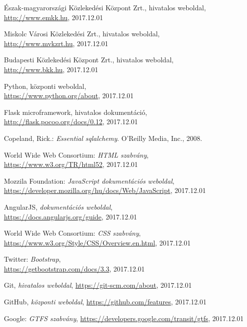 \begin{thebibliography}{x}

Észak-magyarországi Közlekedési Központ Zrt.,
hivatalos weboldal, \\
\url{http://www.emkk.hu}, 2017.12.01

Miskolc Városi Közlekedési Zrt., hivatalos weboldal,\\
\url{http://www.mvkzrt.hu}, 2017.12.01

Budapesti Közlekedési Központ Zrt., hivatalos weboldal, \\
\url{http://www.bkk.hu}, 2017.12.01

Python, központi weboldal, \\
\url{https://www.python.org/about}, 2017.12.01

Flask microframework, hivatalos dokumentáció, \\
\url{http://flask.pocoo.org/docs/0.12}, 2017.12.01

Copeland, Rick.: \emph{Essential sqlalchemy}.  O'Reilly Media, Inc., 2008.

World Wide Web Consortium: \emph{HTML szabvány}, \\ \url{https://www.w3.org/TR/html52}, 2017.12.01

Mozzila Foundation: \emph{JavaScript dokumentációs weboldal}, \\
\url{https://developer.mozilla.org/hu/docs/Web/JavaScript}, 2017.12.01

AngularJS, \emph{dokumentációs weboldal}, \\
\url{https://docs.angularjs.org/guide}, 2017.12.01

World Wide Web Consortium: \emph{CSS szabvány}, \\ \url{https://www.w3.org/Style/CSS/Overview.en.html}, 2017.12.01

Twitter: \emph{Bootstrap}, \\
\url{https://getbootstrap.com/docs/3.3}, 2017.12.01

Git, \emph{hivatalos weboldal}, \url{https://git-scm.com/about}, 2017.12.01

GitHub, \emph{központi weboldal}, \url{https://github.com/features}, 2017.12.01

Google: \emph{GTFS szabvány}, \url{https://developers.google.com/transit/gtfs}, 2017.12.01


\end{thebibliography}

